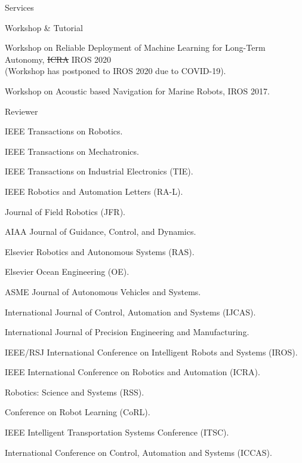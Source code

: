 \begin{rSection}{Services}
\begin{rSubsection}{Workshop \& Tutorial}{}{}{}
  \item Workshop on Reliable Deployment of Machine Learning for Long-Term Autonomy, \sout{ICRA} IROS 2020\\
  (Workshop has postponed to IROS 2020 due to COVID-19).
  \item Workshop on Acoustic based Navigation for Marine Robots, IROS 2017.
\end{rSubsection}

\newpage
\begin{rSubsection}{Reviewer}{}{}{}
  \item IEEE Transactions on Robotics.
  \item IEEE Transactions on Mechatronics.
  \item IEEE Transactions on Industrial Electronics (TIE).
  \item IEEE Robotics and Automation Letters (RA-L).
  \item Journal of Field Robotics (JFR).
  \item AIAA Journal of Guidance, Control, and Dynamics.
  \item Elsevier Robotics and Autonomous Systems (RAS).
  \item Elsevier Ocean Engineering (OE).
  \item ASME Journal of Autonomous Vehicles and Systems.
  \item International Journal of Control, Automation and Systems (IJCAS).
  \item International Journal of Precision Engineering and Manufacturing.
  \item IEEE/RSJ International Conference on Intelligent Robots and Systems (IROS).
  \item IEEE International Conference on Robotics and Automation (ICRA).
  \item Robotics: Science and Systems (RSS).
  \item Conference on Robot Learning (CoRL).
  \item IEEE Intelligent Transportation Systems Conference (ITSC).
  \item International Conference on Control, Automation and Systems (ICCAS).
\end{rSubsection}


\end{rSection}
